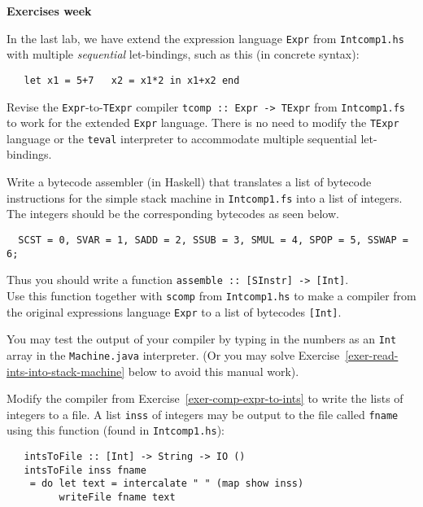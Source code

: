 \documentclass[a4paper]{article}
\begin{document}
\begin{center}
{\Large\bf Exercises week }\\[1ex]
\end{center}



\begin{exercise}\label{exer-multi-let-tcomp}
In the last lab, we have extend the expression language \texttt{Expr} from \texttt{Intcomp1.hs}
  with multiple \emph{sequential} let-bindings, such as this (in
  concrete syntax):

{\codesetup\begin{verbatim}
   let x1 = 5+7   x2 = x1*2 in x1+x2 end
\end{verbatim}}

  Revise the \texttt{Expr}-to-\texttt{TExpr} compiler \texttt{tcomp ::\ 
    Expr -> TExpr} from \texttt{Intcomp1.fs} to work for the extended
  \texttt{Expr} language.
  There is no need to modify the \texttt{TExpr} language or the
  \texttt{teval} interpreter to accommodate multiple sequential
  let-bindings.
\end{exercise}


\begin{exercise}\label{exer-comp-expr-to-ints}
 Write a bytecode assembler (in Haskell) that translates a list
  of bytecode instructions for the simple stack machine in
  \texttt{Intcomp1.fs} into a list of integers.  The integers should be
  the corresponding bytecodes as seen below.
  {\codesetup\begin{verbatim}
  SCST = 0, SVAR = 1, SADD = 2, SSUB = 3, SMUL = 4, SPOP = 5, SSWAP = 6;\end{verbatim}}
  \noindent 
  Thus you should write a function
  \texttt{assemble ::\ [SInstr] -> [Int]}.\\
  
  Use this function together with \texttt{scomp} from
  \texttt{Intcomp1.hs} to make a compiler from the original expressions
  language \texttt{Expr} to a list of bytecodes \texttt{[Int]}.
  
  You may test the output of your compiler by typing in the numbers as
  an \texttt{Int} array in the \texttt{Machine.java} interpreter.  (Or
  you may solve Exercise~\ref{exer-read-ints-into-stack-machine} below
  to avoid this manual work).
\end{exercise}


\begin{exercise}\label{exer-read-ints-into-stack-machine}
  Modify the compiler from Exercise~\ref{exer-comp-expr-to-ints} to
  write the lists of integers to a file.  A list \texttt{inss} of
  integers may be output to the file called \texttt{fname} using this
  function (found in \texttt{Intcomp1.hs}):

{\codesetup\begin{verbatim}
   intsToFile :: [Int] -> String -> IO ()
   intsToFile inss fname 
    = do let text = intercalate " " (map show inss)
         writeFile fname text
\end{verbatim}}

\end{exercise}
\end{document}

